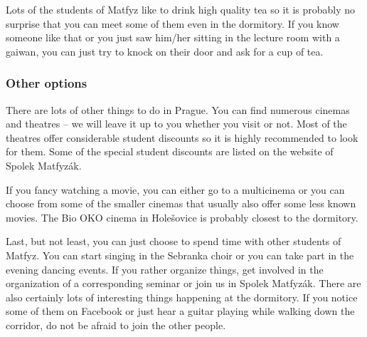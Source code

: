 Lots of the students of Matfyz like to drink high quality tea so it is probably
no surprise that you can meet some of them even in the dormitory.
If you know someone like that or you just saw him/her sitting in the lecture
room with a gaiwan, you can just try to knock on their door and ask for a cup of
tea.


\subsubsection{Other options}
There are lots of other things to do in Prague. You can find numerous cinemas
and theatres -- we will leave it up to you whether you visit or not.
Most of the theatres offer considerable student discounts so it is highly
recommended to look for them. Some of the special student discounts are listed
on the website of Spolek Matfyzák.

If you fancy watching a movie, you can either go to a multicinema or you can
choose from some of the smaller cinemas that usually also offer some less known
movies. The Bio OKO cinema in Holešovice is probably closest to the dormitory.

Last, but not least, you can just choose to spend time with other students of
Matfyz. You can start singing in the Sebranka choir or you can take part in the
evening dancing events.
If you rather organize things, get involved in the organization of a
corresponding seminar or join us in Spolek Matfyzák.
There are also certainly lots of interesting things happening at the dormitory.
If you notice some of them on Facebook or just hear a guitar playing while
walking down the corridor, do not be afraid to join the other people.